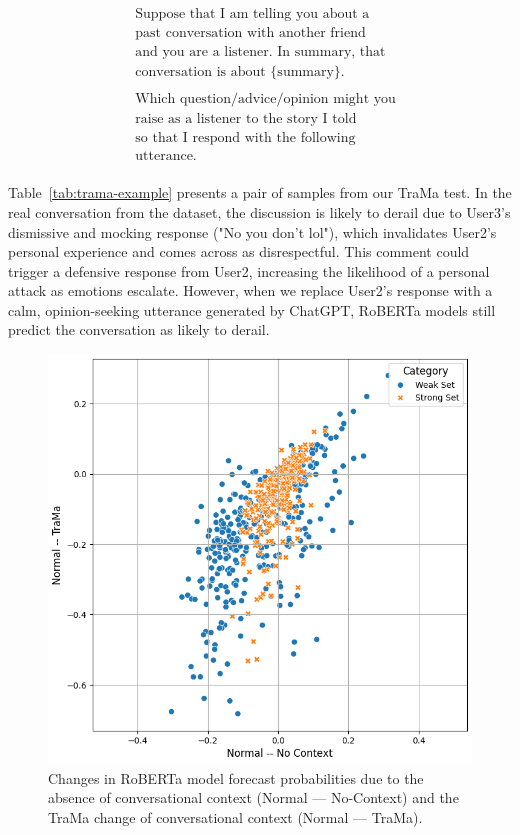 {\ttfamily
\begin{align*}
& \text{Suppose that I am telling you about a}\\
& \text{past conversation with another friend}\\
& \text{and you are a listener. In summary, that}\\ 
& \text{conversation is about \{summary\}.}\\
& \\
& \text{Which question/advice/opinion might you}\\
& \text{raise as a listener to the story I told}\\ 
& \text{so that I respond with the following}\\ 
& \text{utterance.}\\ 
\end{align*}
}

Table~\ref{tab:trama-example} presents a pair of samples from our TraMa test. 
In the real conversation from the dataset, the discussion is likely to derail due to User3's dismissive and mocking response ("No you don't lol"), which invalidates User2's personal experience and comes across as disrespectful. 
This comment could trigger a defensive response from User2, increasing the likelihood of a personal attack as emotions escalate. 
However, when we replace User2's response with a calm, opinion-seeking utterance generated by ChatGPT, RoBERTa models still predict the conversation as likely to derail.




\begin{figure}[t]
    \centering
    \includegraphics[width=\linewidth]{figures/trama_results.png}
    \caption{
        Changes in RoBERTa model forecast probabilities due to the absence of conversational context (Normal --- No-Context) and the TraMa change of conversational context (Normal --- TraMa).}
    \label{fig:trama-results}
\end{figure}

